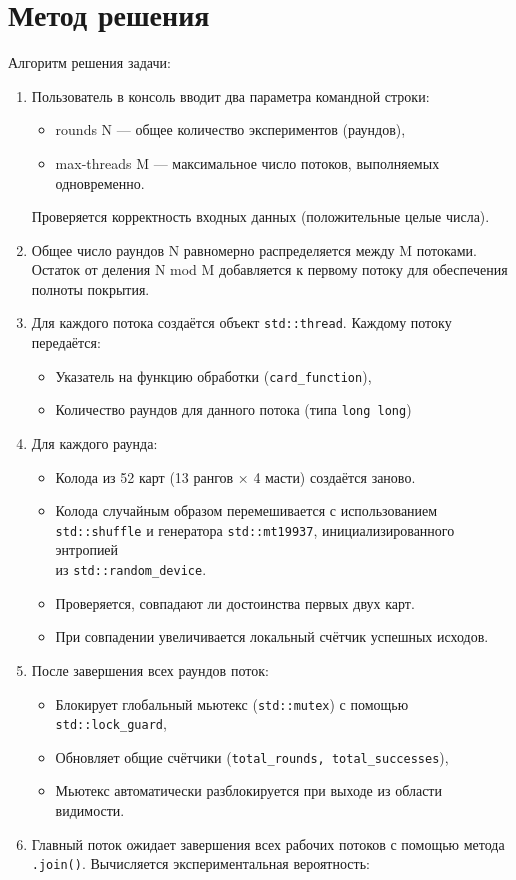 \section{Метод решения}

Алгоритм решения задачи:

\begin{enumerate}
\item Пользователь в консоль вводит два параметра командной строки:
    \begin{itemize}
        \item rounds N — общее количество экспериментов (раундов),
        \item max-threads M — максимальное число потоков, выполняемых одновременно.
    \end{itemize}
    Проверяется корректность входных данных (положительные целые числа).

\item Общее число раундов N равномерно распределяется между M потоками.
Остаток от деления N mod M добавляется к первому потоку для обеспечения полноты покрытия.

\item Для каждого потока создаётся объект \texttt{std::thread}.
Каждому потоку передаётся:
    \begin{itemize}
        \item Указатель на функцию обработки (\texttt{card\_function}),
        \item Количество раундов для данного потока (типа \texttt{long long})
    \end{itemize}
\item Для каждого раунда:
    \begin{itemize}
        \item Колода из 52 карт (13 рангов × 4 масти) создаётся заново.
        \item Колода случайным образом перемешивается с использованием \texttt{std::shuffle} и генератора \texttt{std::mt19937}, инициализированного энтропией\\ из \texttt{std::random\_device}.
        \item Проверяется, совпадают ли достоинства первых двух карт.
        \item При совпадении увеличивается локальный счётчик успешных исходов.
    \end{itemize}
\item После завершения всех раундов поток:
    \begin{itemize}
        \item Блокирует глобальный мьютекс (\texttt{std::mutex}) с помощью \texttt{std::lock\_guard},
        \item Обновляет общие счётчики (\texttt{total\_rounds, total\_successes}),
        \item Мьютекс автоматически разблокируется при выходе из области видимости.
    \end{itemize}
\item Главный поток ожидает завершения всех рабочих потоков с помощью метода \texttt{.join()}.
Вычисляется экспериментальная вероятность:


\end{enumerate}
